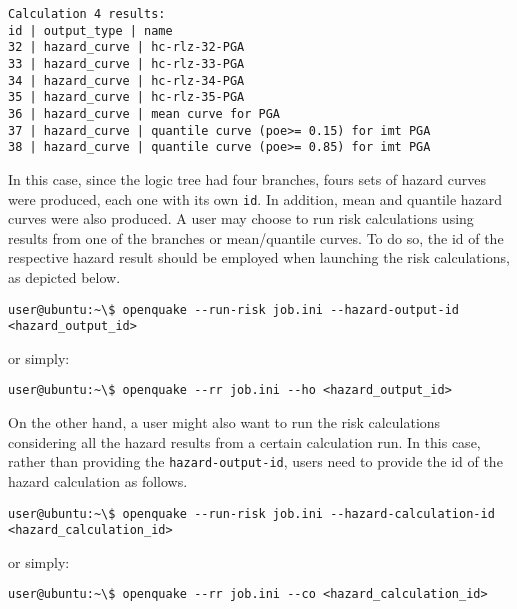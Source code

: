 \begin{Verbatim}[frame=single, commandchars=\\\{\}, samepage=true]
Calculation 4 results:
id | output_type | name
32 | hazard_curve | hc-rlz-32-PGA
33 | hazard_curve | hc-rlz-33-PGA
34 | hazard_curve | hc-rlz-34-PGA
35 | hazard_curve | hc-rlz-35-PGA
36 | hazard_curve | mean curve for PGA
37 | hazard_curve | quantile curve (poe>= 0.15) for imt PGA
38 | hazard_curve | quantile curve (poe>= 0.85) for imt PGA
\end{Verbatim}

In this case, since the logic tree had four branches, fours sets of hazard curves were produced, each one with its own \verb+id+. In addition, mean and quantile hazard curves were also produced. A user may choose to run risk calculations using results from one of the branches or mean/quantile curves. To do so, the id of the respective hazard result should be employed when launching the risk calculations, as depicted below.

\begin{Verbatim}[frame=single, commandchars=\\\{\}, samepage=true]
user@ubuntu:~\$ openquake --run-risk job.ini --hazard-output-id 
<hazard_output_id>
\end{Verbatim}

or simply:

\begin{Verbatim}[frame=single, commandchars=\\\{\}, samepage=true]
user@ubuntu:~\$ openquake --rr job.ini --ho <hazard_output_id>
\end{Verbatim}

On the other hand, a user might also want to run the risk calculations considering all the hazard results from a certain calculation run. In this case, rather than providing the \verb+hazard-output-id+, users need to provide the id of the hazard calculation as follows.

\begin{Verbatim}[frame=single, commandchars=\\\{\}, samepage=true]
user@ubuntu:~\$ openquake --run-risk job.ini --hazard-calculation-id 
<hazard_calculation_id>
\end{Verbatim}

or simply:

\begin{Verbatim}[frame=single, commandchars=\\\{\}, samepage=true]
user@ubuntu:~\$ openquake --rr job.ini --co <hazard_calculation_id>
\end{Verbatim}

